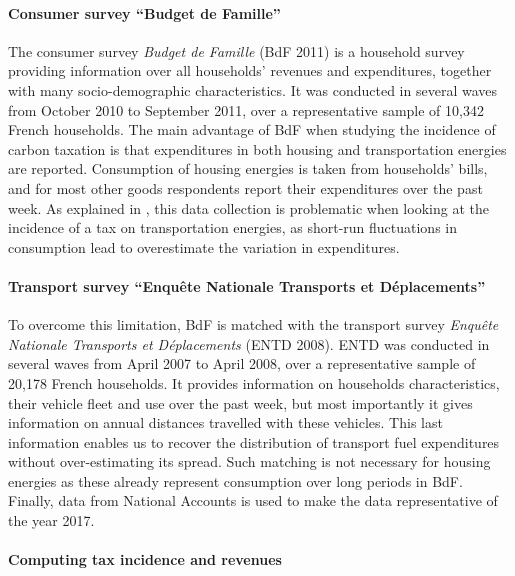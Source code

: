 \documentclass[11pt]{article}
\begin{document}
\paragraph{Consumer survey ``Budget de Famille''}

The consumer survey \emph{Budget de Famille} (BdF 2011) is a household survey providing information over all households' revenues and expenditures, together with many socio-demographic characteristics. It was conducted in several waves from October 2010 to September 2011, over a representative sample of 10,342 French households. The main advantage of BdF when studying the incidence of carbon taxation is that expenditures in both housing and transportation energies are reported. Consumption of housing energies is taken from households' bills, and for most other goods respondents report their expenditures over the past week. As explained in \citet{douenne_vertical_2018}, this data collection is problematic when looking at the incidence of a tax on transportation energies, as short-run fluctuations in consumption lead to overestimate the variation in expenditures.

\paragraph{Transport survey ``Enquête Nationale Transports et Déplacements''}
 To overcome this limitation, BdF is matched with the transport survey \emph{Enquête Nationale Transports et Déplacements} (ENTD 2008). ENTD was conducted in several waves from April 2007 to April 2008, over a representative sample of 20,178 French households. It provides information on households characteristics, their vehicle fleet and use over the past week, but most importantly it gives information on annual distances travelled with these vehicles. This last information enables us to recover the distribution of transport fuel expenditures without over-estimating its spread. Such matching is not necessary for housing energies as these already represent consumption over long periods in BdF. Finally, data from National Accounts is used to make the data representative of the year 2017. %
 
 \paragraph{Computing tax incidence and revenues}
 
\end{document}
